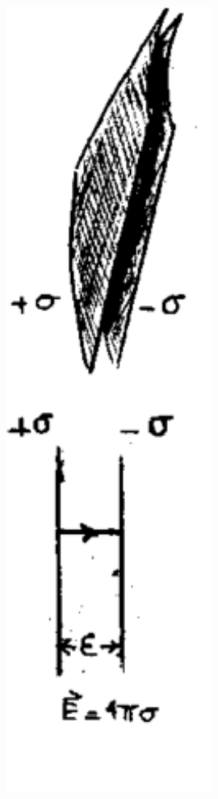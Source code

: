\documentclass[10pt,oneside]{CBFT_book}
\begin{document}
\begin{figure}[htb]
	\begin{center}
	\includegraphics[width=0.6\textwidth]{images/fig_ft1_campo_dipolar3.pdf}	 
	\end{center}
	\caption{}
\end{figure}







\end{document}
